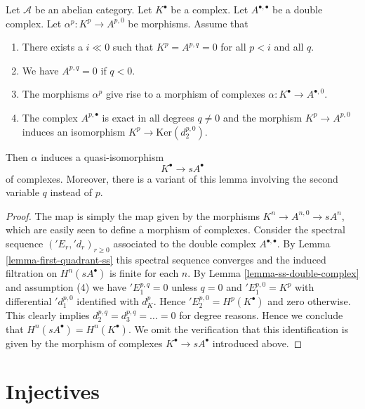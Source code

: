 \begin{lemma}
\label{lemma-double-complex-gives-resolution}
Let $\mathcal{A}$ be an abelian category.
Let $K^\bullet$ be a complex.
Let $A^{\bullet, \bullet}$ be a double complex.
Let $\alpha^p : K^p \to A^{p, 0}$ be morphisms.
Assume that
\begin{enumerate}
\item There exists a $i \ll 0$ such that
$K^p = A^{p, q} = 0$ for all $p < i$ and all $q$.
\item We have $A^{p, q} = 0$ if $q < 0$.
\item The morphisms $\alpha^p$ give rise to a morphism
of complexes $\alpha : K^\bullet \to A^{\bullet, 0}$.
\item The complex $A^{p, \bullet}$ is exact in all degrees
$q \not = 0$ and the morphism $K^p \to A^{p, 0}$ induces
an isomorphism $K^p \to \text{Ker}(d_2^{p, 0})$.
\end{enumerate}
Then $\alpha$ induces a quasi-isomorphism
$$
K^\bullet \longrightarrow sA^\bullet
$$
of complexes.
Moreover, there is a variant of this lemma involving the second
variable $q$ instead of $p$.
\end{lemma}

\begin{proof}
The map is simply the map given by the morphisms
$K^n \to A^{n, 0} \to sA^n$, which are easily seen to define
a morphism of complexes.
Consider the spectral sequence $({}'E_r, {}'d_r)_{r \geq 0}$
associated to the double complex $A^{\bullet, \bullet}$.
By Lemma \ref{lemma-first-quadrant-ss} this spectral sequence converges
and the induced filtration on $H^n(sA^\bullet)$ is finite for each $n$.
By Lemma \ref{lemma-ss-double-complex} and assumption (4) we have
${}'E_1^{p, q} = 0$ unless $q = 0$ and $'E_1^{p, 0} = K^p$
with differential ${}'d_1^{p, 0}$ identified with $d_K^p$.
Hence ${}'E_2^{p, 0} = H^p(K^\bullet)$ and zero otherwise.
This clearly implies $d_2^{p, q} = d_3^{p, q} = \ldots = 0$
for degree reasons. Hence we conclude that $H^n(sA^\bullet) = H^n(K^\bullet)$.
We omit the verification that this identification is given by the
morphism of complexes $K^\bullet \to sA^\bullet$ introduced above.
\end{proof}








\section{Injectives}
\label{section-injectives}

